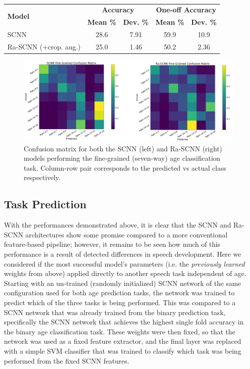 \documentclass[fleqn,10pt]{wlscirep}
\begin{document}
\begin{table}[h]
 \caption{}
 \centering
 \begin{tabular}{l | c | c | c | c}
   \toprule
   \multirow{2}{*}{\textbf{Model}}                 &  \multicolumn{2}{c|}{\textbf{Accuracy}} & \multicolumn{2}{c}{\textbf{One-off Accuracy}} \\
                                                   & \textbf{Mean \%} & \textbf{Dev. \%} & \textbf{Mean \%} & \textbf{Dev. \%} \\
   \toprule
                        SCNN                       &       28.6       &      7.91        &       59.9       &        10.9        \\
   \midrule
                        Ra-SCNN (+crop. aug.)      &       25.0       &       1.46       &      50.2        &        2.36         \\ 
   \bottomrule
 \end{tabular}
 \label{tab:task_results}
\end{table}

\begin{figure}[ht]
  \centering\includegraphics[width=0.7\linewidth]{confusion_matrix.pdf}
   \caption{Confusion matrix for both the SCNN (left) and Ra-SCNN (right) models performing the fine-grained (seven-way) age classification task. Column-row pair corresponds to the predicted vs actual class respectively.}
 \label{fig:fig_confusion}
\end{figure}

\subsection*{Task Prediction}

With the performances demonstrated above, it is clear that the SCNN and Ra-SCNN architectures show some promise compared to a more conventional feature-based pipeline; however, it remains to be seen how much of this performance is a result of detected differences in speech development. Here we considered if the most successful model's parameters (i.e. the {\em previously learned} weights from above) applied directly to another speech task independent of age. Starting with an un-trained (randomly initialized) SCNN network of the same configuration used for both age prediction tasks, the network was trained to predict which of the three tasks is being performed. This was compared to a SCNN network that was already trained from the binary prediction task, specifically the SCNN network that achieves the highest single fold accuracy in the binary age classification task. These weights were then fixed, so that the network was used as a fixed feature extractor, and the final layer was replaced with a simple SVM classifier that was trained to classify which task was being performed from the fixed SCNN features.
\end{document}
